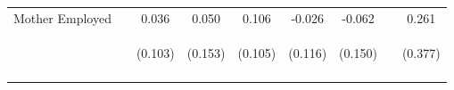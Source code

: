 \begin{tabular}{lcccccccc}
\noalign{\smallskip}Mother Employed &  & 0.036 & 0.050 & 0.106 & -0.026 & -0.062 &  & 0.261\\
 & \begin{footnotesize}\end{footnotesize} & \begin{footnotesize}(0.103)\end{footnotesize} & \begin{footnotesize}(0.153)\end{footnotesize} & \begin{footnotesize}(0.105)\end{footnotesize} & \begin{footnotesize}(0.116)\end{footnotesize} & \begin{footnotesize}(0.150)\end{footnotesize} & \begin{footnotesize}\end{footnotesize} & \begin{footnotesize}(0.377)\end{footnotesize}\\
\noalign{\smallskip}\hline\end{tabular}\\

